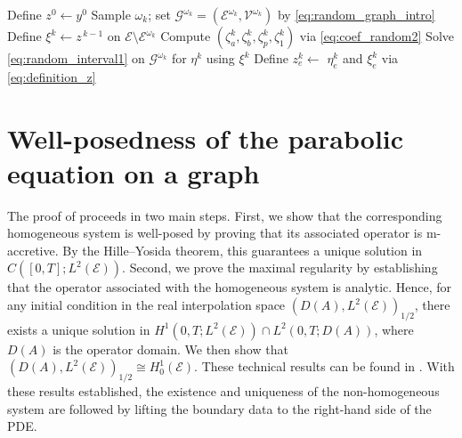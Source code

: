 \documentclass[10pt,a4paper]{amsart}
\begin{document}
\begin{algorithm}[h!]
  \caption{Subgraph Decomposition Scheme}\label{alg1}
  \begin{algorithmic}[1]
    \State Define $z^{0}\gets y^{0}$
      \State Sample $\omega_{k}$; set $\mathcal{G}^{\omega_k}=(\mathcal{E}^{\omega_k},\mathcal{V}^{\omega_k})$ by \eqref{eq:random_graph_intro}
      \State Define $\xi^{k}\gets z^{\,k-1}$ on $\mathcal{E}\setminus\mathcal{E}^{\omega_k}$
      \State Compute $(\zeta_a^k,\zeta_b^k,\zeta_p^k,\zeta_1^k)$ via \eqref{eq:coef_random2}
      \State Solve \eqref{eq:random_interval1} on $\mathcal{G}^{\omega_k}$ for $\eta^{k}$ using $\xi^{k}$
      \State Define $z^{k}_{e}\gets$  
        $\eta^{k}_{e}$ and $\xi^{k}_{e}$ via \eqref{eq:definition_z}
    \EndFor
  \end{algorithmic}
\end{algorithm}


\section{Well-posedness of the parabolic equation on a graph}\label{sec:well-posedness} The proof of  proceeds in two main steps. First, we show that the corresponding homogeneous system is well-posed by proving that its associated operator is m-accretive. By the Hille--Yosida theorem, this guarantees a unique solution in $C([0,T];L^2(\mathcal{E}))$. Second, we prove the maximal regularity by establishing that the operator associated with the homogeneous system is analytic. Hence, for any initial condition in the real interpolation space $(D(A),L^2(\mathcal{E}))_{1/2}$, there exists a unique solution in $H^1(0,T; L^2(\mathcal{E}))\cap L^2(0,T;D(A))$, where $D(A)$ is the operator domain. We then show that $(D(A),L^2(\mathcal{E}))_{1/2}\cong H_0^1(\mathcal{E})$. These technical results can be found in . With these results established, the existence and uniqueness of the non-homogeneous system are followed by lifting the boundary data to the right-hand side of the PDE.
\end{document}
